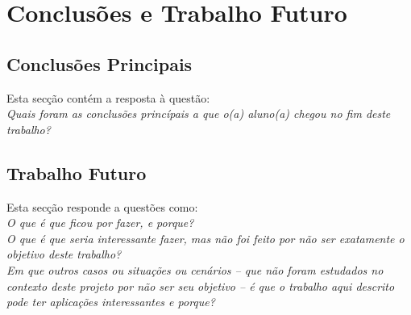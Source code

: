 \chapter{Conclusões e Trabalho Futuro}
\label{chap:conc-trab-futuro}

\section{Conclusões Principais}
\label{sec:conc-princ}

Esta secção contém a resposta à questão: \\
\emph{Quais foram as conclusões princípais a que o(a) aluno(a) chegou no fim deste trabalho?}

\section{Trabalho Futuro}
\label{sec:trab-futuro}

Esta secção responde a questões como:\\
\emph{O que é que ficou por fazer, e porque?}\\
\emph{O que é que seria interessante fazer, mas não foi feito por não ser exatamente o objetivo deste trabalho?}\\
\emph{Em que outros casos ou situações ou cenários -- que não foram estudados no contexto deste projeto por não ser seu objetivo -- é que o trabalho aqui descrito pode ter aplicações interessantes e porque?}